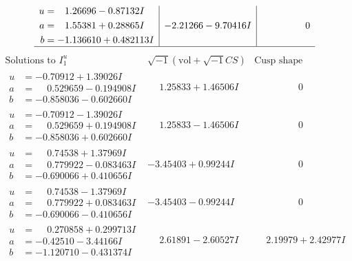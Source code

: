 \documentclass[1p]{elsarticle_modified}
\theoremstyle{definition}
\newcommand{\I}{\sqrt{-1}}
\begin{document}
$$\begin{array}{c|c|c}
\begin{aligned}
u &= \phantom{-}1.26696 - 0.87132 I \\
a &= \phantom{-}1.55381 + 0.28865 I \\
b &= -1.136610 + 0.482113 I\end{aligned}
 & -2.21266 - 9.70416 I & \phantom{-0.000000 } 0\\
 \hline 
 \end{array}$$\newpage$$\begin{array}{c|c|c}  
\text{Solutions to }I^u_{1}& \I (\text{vol} + \sqrt{-1}CS) & \text{Cusp shape}\\
 \hline 
\begin{aligned}
u &= -0.70912 + 1.39026 I \\
a &= \phantom{-}0.529659 - 0.194908 I \\
b &= -0.858036 - 0.602660 I\end{aligned}
 & \phantom{-}1.25833 + 1.46506 I & \phantom{-0.000000 } 0 \\ \hline\begin{aligned}
u &= -0.70912 - 1.39026 I \\
a &= \phantom{-}0.529659 + 0.194908 I \\
b &= -0.858036 + 0.602660 I\end{aligned}
 & \phantom{-}1.25833 - 1.46506 I & \phantom{-0.000000 } 0 \\ \hline\begin{aligned}
u &= \phantom{-}0.74538 + 1.37969 I \\
a &= \phantom{-}0.779922 - 0.083463 I \\
b &= -0.690066 + 0.410656 I\end{aligned}
 & -3.45403 + 0.99244 I & \phantom{-0.000000 } 0 \\ \hline\begin{aligned}
u &= \phantom{-}0.74538 - 1.37969 I \\
a &= \phantom{-}0.779922 + 0.083463 I \\
b &= -0.690066 - 0.410656 I\end{aligned}
 & -3.45403 - 0.99244 I & \phantom{-0.000000 } 0 \\ \hline\begin{aligned}
u &= \phantom{-}0.270858 + 0.299713 I \\
a &= -0.42510 - 3.44166 I \\
b &= -1.120710 - 0.431374 I\end{aligned}
 & \phantom{-}2.61891 - 2.60527 I & \phantom{-}2.19979 + 2.42977 I \\ \hline\begin{aligned}

\end{aligned}
\end{array}$$
\end{document}
